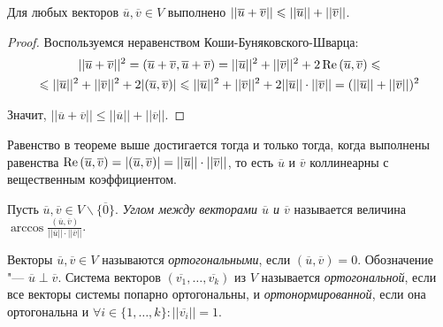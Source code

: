 \begin{theorem}
	Для любых векторов $\overline{u}, \overline{v} \in V$ выполнено $||\overline{u} + \overline{v}|| \le ||\overline{u}|| \hm{+} ||\overline{v}||$.
\end{theorem}

\begin{proof}
	Воспользуемся неравенством Коши-Буняковского-Шварца:
	\begin{multline*}
		||\overline{u} + \overline{v}||^2 = (\overline{u} + \overline{v}, \overline{u} + \overline{v}) = ||\overline{u}||^2 + ||\overline{v}||^2 + 2\re{(\overline{u}, \overline{v})} \le
		\\
		\le ||\overline{u}||^2 + ||\overline{v}||^2 + 2|{(\overline{u}, \overline{v})}| \le ||\overline{u}||^2 + ||\overline{v}||^2 + 2||\overline{u}||\cdot||\overline{v}|| = (||\overline{u}|| \hm{+} ||\overline{v}||)^2
	\end{multline*}
	
	Значит, $||\overline{u} + \overline{v}|| \le ||\overline{u}|| + ||\overline{v}||$.
\end{proof}

\begin{note}
	Равенство в теореме выше достигается тогда и только тогда, когда выполнены равенства $\operatorname{Re}{(\overline{u}, \overline{v})} = |(\overline{u}, \overline{v})| = ||\overline{u}||\cdot||\overline{v}||$, то есть $\overline{u}$ и $\overline{v}$ коллинеарны с вещественным коэффициентом.
\end{note}

\begin{definition}
	Пусть $\overline{u}, \overline{v} \in V \backslash \{\overline0\}$. \textit{Углом между векторами $\overline{u}$ и $\overline{v}$} называется величина $\arccos{\frac{(\overline{u}, \overline{v})}{||\overline{u}||\cdot||\overline{v}||}}$.
\end{definition}

\begin{definition}
	Векторы $\overline{u}, \overline{v} \in V$ называются \textit{ортогональными}, если $(\overline{u}, \overline{v}) = 0$. Обозначение "--- $\overline{u} \perp \overline{v}$. Система векторов $(\overline{v_1}, \dots, \overline{v_k})$ из $V$ называется \textit{ортогональной}, если все векторы системы попарно ортогональны, и \textit{ортонормированной}, если она ортогональна и $\forall i \in \{1, \dots, k\}: ||\overline{v_i}|| = 1$.
\end{definition}

